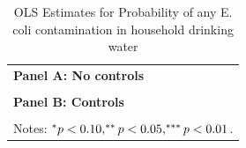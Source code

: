 \begin{table}[!ht]\centering
\caption{OLS Estimates for Probability of any E. coli contamination in household drinking water}\label{tab:Est_EColi_OLS_SomeRiskHome_full}
\begin{tabular}{l}
\hline \hline
\textbf{Panel A: No controls}\\[2pt]
\\[6pt]
\textbf{Panel B: Controls}\\[2pt]
\\[4pt]
\multicolumn{1}{p{0.95\linewidth}}{Notes: $\sym{*} p<0.10,\sym{**} p<0.05,\sym{***} p<0.01$.} \\
\hline
\end{tabular}
\end{table}
